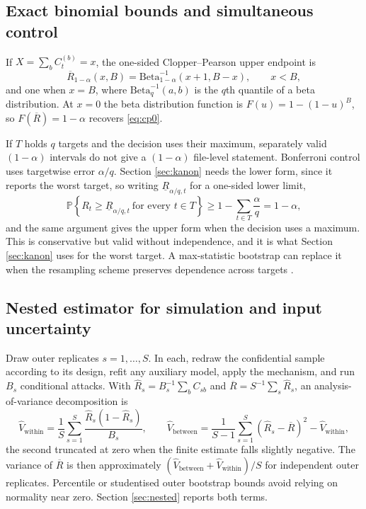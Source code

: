 \documentclass[11pt,a4paper]{article}
\theoremstyle{plain}
\theoremstyle{definition}
\newcommand{\Prob}{\mathbb{P}}
\begin{document}
\subsection{Exact binomial bounds and simultaneous control}

If $X=\sum_b C_t^{(b)}=x$, the one-sided Clopper--Pearson upper endpoint is
\begin{equation}
\overline{R}_{1-\alpha}(x,B)=
\mathrm{Beta}^{-1}_{1-\alpha}(x+1,B-x),\qquad x<B,
\label{eq:cp-general}
\end{equation}
and one when $x=B$, where $\mathrm{Beta}^{-1}_q(a,b)$ is the $q$th quantile of a
beta distribution. At $x=0$ the beta distribution function is $F(u)=1-(1-u)^B$,
so $F(\overline{R})=1-\alpha$ recovers \eqref{eq:cp0}.

If $T$ holds $q$ targets and the decision uses their maximum, separately valid
$(1-\alpha)$ intervals do not give a $(1-\alpha)$ file-level statement. Bonferroni control uses targetwise error $\alpha/q$. Section \ref{sec:kanon} needs
the lower form, since it reports the worst target, so writing
$\underline{R}_{\alpha/q,t}$ for a one-sided lower limit,
\begin{equation}
\Prob\left\{R_t\ge \underline{R}_{\alpha/q,t}\ \text{for every }t\in T\right\}
\ge 1-\sum_{t\in T}\frac{\alpha}{q}=1-\alpha ,
\label{eq:bonf}
\end{equation}
and the same argument gives the upper form when the decision uses a maximum.
This is conservative but valid without independence, and it is what Section
\ref{sec:kanon} uses for the worst target. A max-statistic bootstrap can replace
it when the resampling scheme preserves dependence across targets
\citep{efron1993}.

\subsection{Nested estimator for simulation and input uncertainty}

Draw outer replicates $s=1,\dots,S$. In each, redraw the confidential sample
according to its design, refit any auxiliary model, apply the mechanism, and run
$B_s$ conditional attacks. With $\widehat R_s=B_s^{-1}\sum_b C_{sb}$ and
$\overline R=S^{-1}\sum_s \widehat R_s$, an analysis-of-variance decomposition is
\begin{equation}
\widehat V_{\mathrm{within}}
 =\frac1S\sum_{s=1}^S\frac{\widehat R_s(1-\widehat R_s)}{B_s},\qquad
\widehat V_{\mathrm{between}}
 =\frac{1}{S-1}\sum_{s=1}^S(\widehat R_s-\overline R)^2
   -\widehat V_{\mathrm{within}},
\end{equation}
the second truncated at zero when the finite estimate falls slightly negative.
The variance of $\overline R$ is then approximately
$(\widehat V_{\mathrm{between}}+\widehat V_{\mathrm{within}})/S$ for independent
outer replicates. Percentile or studentised outer bootstrap bounds avoid relying
on normality near zero. Section \ref{sec:nested} reports both terms.
\end{document}
